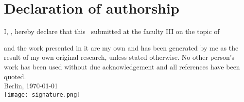 \chapter*{Declaration of authorship}

I, \myauthor, hereby declare that this \mysubject\ submitted at the faculty III on the topic of
\vspace{0.5cm}
\begin{center}
	\textbf{\mytitle}
\end{center}
\vspace{0.5cm}
and the work presented in it are my own and has been generated by me as the result of my own original research, unless stated otherwise. No other person’s work has been used without due acknowledgement and all references have been quoted.
\\[4ex]
Berlin, \today \\
\texttt{[image: signature.png]}
\\[-4ex] \newline
\myauthor
